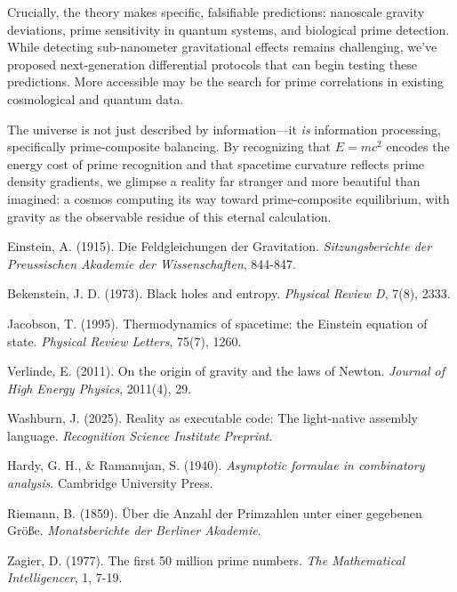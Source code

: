 \documentclass[12pt]{article}
\begin{document}
Crucially, the theory makes specific, falsifiable predictions: nanoscale gravity deviations, prime sensitivity in quantum systems, and biological prime detection. While detecting sub-nanometer gravitational effects remains challenging, we've proposed next-generation differential protocols that can begin testing these predictions. More accessible may be the search for prime correlations in existing cosmological and quantum data.

The universe is not just described by information—it \textit{is} information processing, specifically prime-composite balancing. By recognizing that $E = mc^2$ encodes the energy cost of prime recognition and that spacetime curvature reflects prime density gradients, we glimpse a reality far stranger and more beautiful than imagined: a cosmos computing its way toward prime-composite equilibrium, with gravity as the observable residue of this eternal calculation.

\begin{thebibliography}{99}

Einstein, A. (1915). Die Feldgleichungen der Gravitation. \textit{Sitzungsberichte der Preussischen Akademie der Wissenschaften}, 844-847.

Bekenstein, J. D. (1973). Black holes and entropy. \textit{Physical Review D}, 7(8), 2333.

Jacobson, T. (1995). Thermodynamics of spacetime: the Einstein equation of state. \textit{Physical Review Letters}, 75(7), 1260.

Verlinde, E. (2011). On the origin of gravity and the laws of Newton. \textit{Journal of High Energy Physics}, 2011(4), 29.

Washburn, J. (2025). Reality as executable code: The light-native assembly language. \textit{Recognition Science Institute Preprint}.

Hardy, G. H., \& Ramanujan, S. (1940). \textit{Asymptotic formulae in combinatory analysis}. Cambridge University Press.

Riemann, B. (1859). Über die Anzahl der Primzahlen unter einer gegebenen Größe. \textit{Monatsberichte der Berliner Akademie}.

Zagier, D. (1977). The first 50 million prime numbers. \textit{The Mathematical Intelligencer}, 1, 7-19.

\end{thebibliography}
\end{document}

